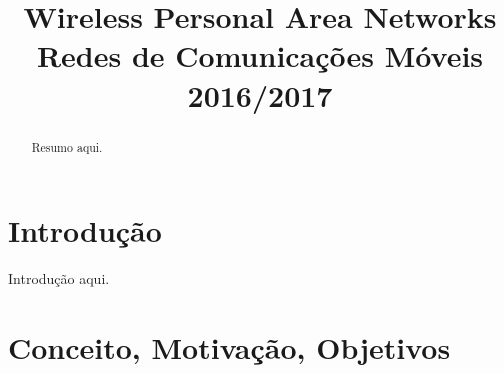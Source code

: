 \documentclass[conference]{IEEEtran}
\begin{document}
\title{Wireless Personal Area Networks\\
  \large Redes de Comunicações Móveis\\
  2016/2017
}

\author{
\and
{}
}

\maketitle

\begin{abstract}
Resumo aqui.
\end{abstract}


\IEEEpeerreviewmaketitle


\section{Introdução}
Introdução aqui.



\section{Conceito, Motivação, Objetivos}
\end{document}
